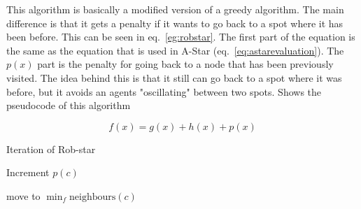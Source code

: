 This algorithm is basically a modified version of a greedy algorithm. The main difference is that it gets a penalty if it wants to go back to a spot where it has been before. This can be seen in eq.~\ref{eg:robstar}. The first part of the equation is the same as the equation that is used in A-Star (eq.~\ref{eq:astarevaluation}). The $p(x)$ part is the penalty for going back to a node that has been previously visited. The idea behind this is that it still can go back to a spot where it was before, but it avoids an agents "oscillating" between two spots. Shows the pseudocode of this algorithm

\begin{equation}
	\label{eq:robstar}
 	f(x) = g(x) + h(x) + p(x)
\end{equation}


\begin{algorithm}
    \caption{Iteration of Rob-star}
    Increment $p(c)$\;
    
    move to $\min_f \mathrm{neighbours}(c)$
\end{algorithm}

        
        
        
        
        
    
